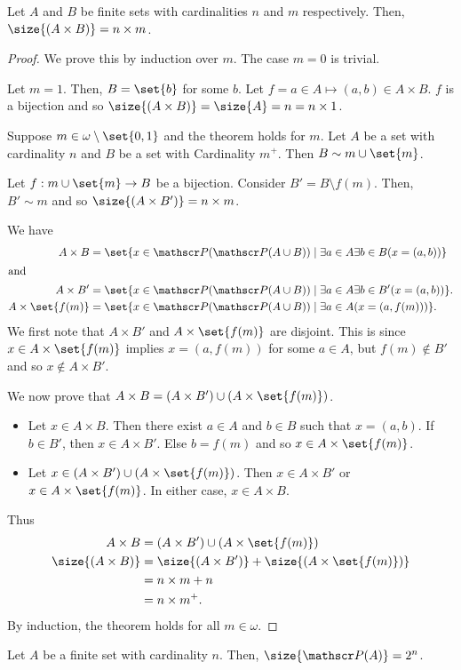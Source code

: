 \begin{theorem}[Product] \label{thm:cardinality:product}
    Let $A$ and $B$ be finite sets with cardinalities $n$ and $m$ respectively.
    Then, $\size{(A \times B)} = n \times m$.
\end{theorem}
\begin{proof}
    We prove this by induction over $m$.
    The case $m = 0$ is trivial.

    Let $m = 1$.
    Then, $B = \set{b}$ for some $b$.
    Let $f = a \in A \mapsto (a, b) \in A \times B$.
    $f$ is a bijection and so $\size{(A \times B)} = \size{A} = n = n \times 1$.

    Suppose $m \in \omega \setminus \set{0, 1}$ and the theorem holds for $m$.
    Let $A$ be a set with cardinality $n$ and $B$ be a set with Cardinality
    $m^{+}$.
    Then $B \sim m \cup \set{m}$.

    Let $f : m \cup \set{m} \to B$ be a bijection.
    Consider $B' = B \setminus f(m)$.
    Then, $B' \sim m$ and so $\size{(A \times B')} = n \times m$.

    We have \begin{align*}
        A \times B &= \set{x \in \pset{\pset{A \cup B}} \mid \exists a \in A 
        \exists b \in B (x = (a, b))} \\
        \shortintertext{and}
        A \times B' &= \set{x \in \pset{\pset{A \cup B}} \mid \exists a \in A
        \exists b \in B' (x = (a, b))}. \\
        A \times \set{f(m)} &= \set{x \in \pset{\pset{A \cup B}} \mid \exists
            a \in A (x = (a, f(m)))}.
    \end{align*}
    We first note that $A \times B'$ and $A \times \set{f(m)}$ are disjoint.
    This is since $x \in A \times \set{f(m)}$ implies $x = (a, f(m))$ for some
    $a \in A$, but $f(m) \notin B'$ and so $x \notin A \times B'$.

    We now prove that $A \times B = (A \times B') \cup (A \times \set{f(m)})$.
    \begin{itemize}
        \item Let $x \in A \times B$.
            Then there exist $a \in A$ and $b \in B$ such that $x = (a, b)$.
            If $b \in B'$, then $x \in A \times B'$.
            Else $b = f(m)$ and so $x \in A \times \set{f(m)}$.
        \item Let $x \in (A \times B') \cup (A \times \set{f(m)})$.
            Then $x \in A \times B'$ or $x \in A \times \set{f(m)}$.
            In either case, $x \in A \times B$.
    \end{itemize}

    Thus
    \begin{align*}
        A \times B &= (A \times B') \cup (A \times \set{f(m)}) \\
        \size{(A \times B)} &= \size{(A \times B')} + \size{(A \times \set{f(m)})} \\
        &= n \times m + n \\
        &= n \times m^{+}.
    \end{align*}
    By induction, the theorem holds for all $m \in \omega$.
\end{proof}

\begin{theorem} \label{thm:cardinality:power_set}
    Let $A$ be a finite set with cardinality $n$.
    Then, $\size{\pset{A}} = 2^{n}$.
\end{theorem}
